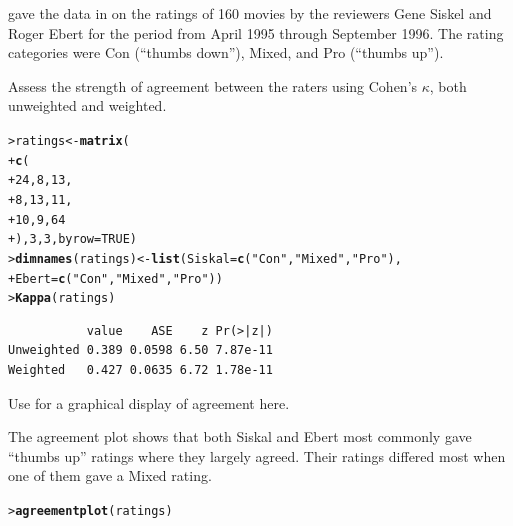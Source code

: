 \documentclass[10pt]{report}\usepackage[]{graphicx}\usepackage[]{color}
\makeatletter
\newcommand{\hlnum}[1]{\textcolor[rgb]{0.686,0.059,0.569}{#1}}%
\newcommand{\hlstr}[1]{\textcolor[rgb]{0.192,0.494,0.8}{#1}}%
\newcommand{\hlstd}[1]{\textcolor[rgb]{0.345,0.345,0.345}{#1}}%
\newcommand{\hlkwb}[1]{\textcolor[rgb]{0.69,0.353,0.396}{#1}}%
\newcommand{\hlkwc}[1]{\textcolor[rgb]{0.333,0.667,0.333}{#1}}%
\newcommand{\hlkwd}[1]{\textcolor[rgb]{0.737,0.353,0.396}{\textbf{#1}}}%
\newenvironment{kframe}{%
 \def\at@end@of@kframe{}%
 \ifinner\ifhmode%
  \def\at@end@of@kframe{\end{minipage}}%
  \begin{minipage}{\columnwidth}%
 \fi\fi%
 \def\FrameCommand##1{\hskip\@totalleftmargin \hskip-\fboxsep
 \colorbox{shadecolor}{##1}\hskip-\fboxsep
     \hskip-\linewidth \hskip-\@totalleftmargin \hskip\columnwidth}%
 \MakeFramed {\advance\hsize-\width
   \@totalleftmargin\z@ \linewidth\hsize
   \@setminipage}}%
 {\par\unskip\endMakeFramed%
 \at@end@of@kframe}
\newenvironment{knitrout}{}{} %
\renewenvironment{knitrout}{\small\renewcommand{\baselinestretch}{.85}}{} %
\makeatother
\begin{document}
\begin{Exercises}
\begin{enumerate*}
    \end{enumerate*}

  \exercise \citet{AgrestiWinner:1997} gave the data in  on the
  ratings of 160 movies by the reviewers Gene Siskel and Roger Ebert for the period
  from April 1995 through September 1996. The rating categories were Con (``thumbs down''),
  Mixed, and Pro (``thumbs up'').
  
  \begin{enumerate*}
     \item Assess the strength of agreement between the raters using Cohen's
       $\kappa$, both unweighted and weighted.
       \begin{ans}
\begin{knitrout}\footnotesize
{}\color{fgcolor}\begin{kframe}
\begin{alltt}
\hlstd{> }\hlstd{ratings} \hlkwb{<-} \hlkwd{matrix}\hlstd{(}
\hlstd{+ }\hlkwd{c}\hlstd{(}
\hlstd{+ }  \hlnum{24}\hlstd{,}  \hlnum{8}\hlstd{,} \hlnum{13}\hlstd{,}
\hlstd{+ }   \hlnum{8}\hlstd{,} \hlnum{13}\hlstd{,} \hlnum{11}\hlstd{,}
\hlstd{+ }  \hlnum{10}\hlstd{,}  \hlnum{9}\hlstd{,} \hlnum{64}
\hlstd{+ } \hlstd{),} \hlnum{3}\hlstd{,} \hlnum{3}\hlstd{,} \hlkwc{byrow}\hlstd{=}\hlnum{TRUE}\hlstd{)}
\hlstd{> }\hlkwd{dimnames}\hlstd{(ratings)} \hlkwb{<-} \hlkwd{list}\hlstd{(}\hlkwc{Siskal}\hlstd{=}\hlkwd{c}\hlstd{(}\hlstr{"Con"}\hlstd{,} \hlstr{"Mixed"}\hlstd{,} \hlstr{"Pro"}\hlstd{),}
\hlstd{+ }                          \hlkwc{Ebert} \hlstd{=}\hlkwd{c}\hlstd{(}\hlstr{"Con"}\hlstd{,} \hlstr{"Mixed"}\hlstd{,} \hlstr{"Pro"}\hlstd{))}
\hlstd{> }\hlkwd{Kappa}\hlstd{(ratings)}
\end{alltt}
\begin{verbatim}
           value    ASE    z Pr(>|z|)
Unweighted 0.389 0.0598 6.50 7.87e-11
Weighted   0.427 0.0635 6.72 1.78e-11
\end{verbatim}
\end{kframe}
\end{knitrout}
       \end{ans}
       
     \item Use  for a graphical display of agreement here.
     \begin{ans}
     The agreement plot shows that both Siskal and Ebert most commonly gave
     ``thumbs up'' ratings where they largely agreed.  Their ratings differed
     most when one of them gave a Mixed rating.
\begin{knitrout}\footnotesize
{}\color{fgcolor}\begin{kframe}
\begin{alltt}
\hlstd{> }\hlkwd{agreementplot}\hlstd{(ratings)}
\end{alltt}
\end{kframe}


\end{knitrout}
\end{ans}
\end{enumerate*}
\end{Exercises}
\end{document}

